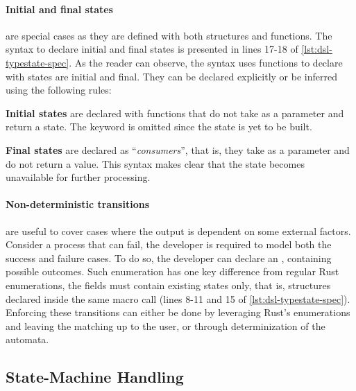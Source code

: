 \paragraph{Initial and final states} are special cases as they are defined with both structures and functions.
The syntax to declare initial and final states is presented in lines 17-18 of \autoref{lst:dsl-typestate-spec}.
As the reader can observe, the syntax uses functions to declare with states are initial and final.
They can be declared explicitly or be inferred using the following rules:
\begin{compactitem}
    \item \textbf{Initial states} are declared with functions that do not take  as a parameter and return a state.
    The  keyword is omitted since the state is yet to be built.
    \item \textbf{Final states} are declared as “\emph{consumers}”, that is, they take  as a parameter and do not return a value.
    This syntax makes clear that the state becomes unavailable for further processing.
\end{compactitem}

\paragraph{Non-deterministic transitions} are useful to cover cases where the output is dependent on some external factors.
Consider a process that can fail, the developer is required to model both the success and failure cases.
To do so, the developer can declare an , containing possible outcomes.
Such enumeration has one key difference from regular Rust enumerations, the fields must contain existing states only,
that is, structures declared inside the same macro call (lines 8-11 and 15 of \autoref{lst:dsl-typestate-spec}).
Enforcing these transitions can either be done by leveraging Rust's enumerations and leaving the matching up to the user,
or through determinization of the automata.






\subsection{State-Machine Handling}\label{sec:arch:fsm}

